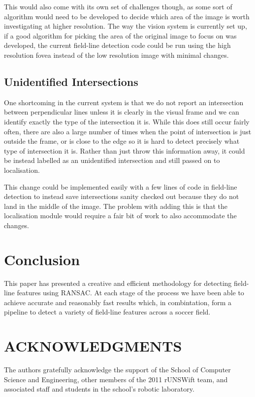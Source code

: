 \documentclass{article}
\begin{document}
This would also come with its own set of challenges though, as some sort of algorithm would need to be developed to decide which area of the image is worth investigating at higher resolution. The way the vision system is currently set up, if a good algorithm for picking the area of the original image to focus on was developed, the current field-line detection code could be run using the high resolution fovea instead of the low resolution image with minimal changes.

\subsection{Unidentified Intersections}
One shortcoming in the current system is that we do not report an intersection between perpendicular lines unless it is clearly in the visual frame and we can identify exactly the type of the intersection it is. While this does still occur fairly often, there are also a large number of times when the point of  intersection is just outside the frame, or is close to the edge so it is hard to detect precisely what type of intersection it is. Rather than just throw this information away, it could be instead labelled as an unidentified intersection and still passed on to localisation.

This change could be implemented easily with a few lines of code in field-line detection to instead save intersections sanity checked out because they do not land in the middle of the image. The problem with adding this is that the localisation module would require a fair bit of work to also accommodate the changes.

\section{Conclusion}
This paper has presented a creative and efficient methodology for detecting field-line features using RANSAC. At each stage of the process we have been able to achieve accurate and reasonably fast results which, in combintation, form a pipeline to detect a variety of field-line features across a soccer field.

\section{ACKNOWLEDGMENTS}

The authors gratefully acknowledge the support of the School of Computer Science and Engineering, other members of the 2011 rUNSWift team, and associated staff and students in the school's robotic laboratory.



\end{document}
